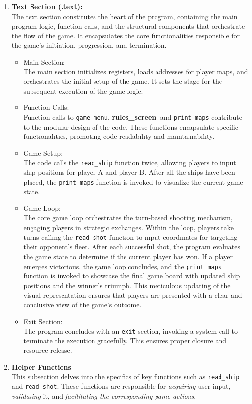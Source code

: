 \begin{enumerate}
    \item \textbf{Text Section (.text):} \\
    The text section constitutes the heart of the program, containing the main program logic, function calls, and the structural components that orchestrate the flow of the game. It encapsulates the core functionalities responsible for the game's initiation, progression, and termination.
        \begin{itemize}
            \item Main Section:\\
            The main section initializes registers, loads addresses for player maps, and orchestrates the initial setup of the game. It sets the stage for the subsequent execution of the game logic.
            \item Function Calls:\\
            Function calls to \texttt{game\_menu}, \textbf{rules\_screen}, and \texttt{print\_maps} contribute to the modular design of the code. These functions encapsulate specific functionalities, promoting code readability and maintainability.
            \item Game Setup:\\
            The code calls the \texttt{read\_ship} function twice, allowing players to input ship positions for player A and player B. After all the ships have been placed, the \texttt{print\_maps} function is invoked to visualize the current game state.
            \item Game Loop:\\
            The core game loop orchestrates the turn-based shooting mechanism, engaging players in strategic exchanges. Within the loop, players take turns calling the \texttt{read\_shot} function to input coordinates for targeting their opponent's fleet. After each successful shot, the program evaluates the game state to determine if the current player has won. If a player emerges victorious, the game loop concludes, and the \texttt{print\_maps} function is invoked to showcase the final game board with updated ship positions and the winner's triumph. This meticulous updating of the visual representation ensures that players are presented with a clear and conclusive view of the game's outcome.
            \item Exit Section:\\
            The program concludes with an \texttt{exit} section, invoking a system call to terminate the execution gracefully. This ensures proper closure and resource release.
        \end{itemize}

    \item \textbf{Helper Functions} \\
    This subsection delves into the specifics of key functions such as \texttt{read\_ship} and \texttt{read\_shot}. These functions are responsible for \textit{acquiring} user input, \textit{validating} it, and \textit{facilitating the corresponding game actions}.
\end{enumerate}


